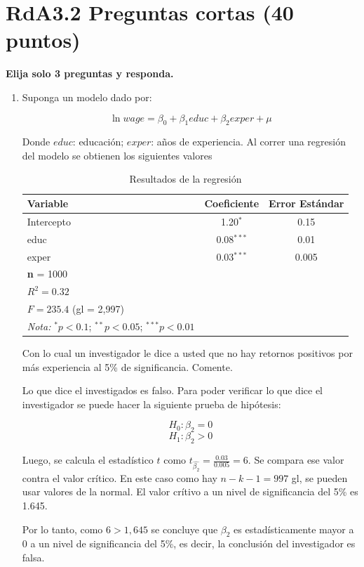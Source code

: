 \documentclass[10pt,a4paper]{article}
\begin{document}
\section{RdA3.2  Preguntas cortas (40 puntos)}
{\bf Elija solo 3 preguntas y responda. }
\begin{enumerate}
   \item    Suponga un modelo dado por:
    
    $$\ln{wage} = \beta_0 + \beta_1 educ + \beta_2 exper + \mu$$
    
    Donde $educ$: educación; $exper$: años de experiencia. Al correr una regresión del modelo se obtienen los siguientes valores
    \begin{table}[H] 
    \centering
    \caption{Resultados de la regresión}
    \begin{tabular}{lcc}
    \hline
    \hline
    \textbf{Variable} & \textbf{Coeficiente} & \textbf{Error Estándar} \\
    \hline
    Intercepto & 1.20$^{*}$ & 0.15 \\
    educ & 0.08$^{***}$ & 0.01 \\
    exper & 0.03$^{***}$ & 0.005 \\
    \hline
    \multicolumn{3}{l}{\textbf{n} = 1000} \\
    \multicolumn{3}{l}{$R^2 = 0.32$} \\
    \multicolumn{3}{l}{$F = 235.4$ (gl = 2,997)} \\
    \hline
    \hline
    \textit{Nota:} $^{*}p<0.1$; $^{**}p<0.05$; $^{***}p<0.01$
    \end{tabular}
    \end{table}
    
    {Con lo cual un investigador le dice a usted que no hay retornos positivos por más experiencia al 5\% de significancia. Comente.}\\
    
    {\color{blue} Lo que dice el investigados es falso. Para poder verificar lo que dice el investigador se puede hacer la siguiente prueba de hipótesis:
    
    $$H_0: \beta_2 = 0$$
    $$H_1: \beta_2 > 0$$
    
    Luego, se calcula el estadístico $t$ como $t_{\hat{\beta_2}} = \frac{0.03}{0.005} = 6$. Se compara ese valor contra el valor crítico. En este caso como hay $n-k-1 = 997$ gl, se pueden usar valores de la normal. El valor crítivo a un nivel de significancia del 5\% es 1.645.
    
    Por lo tanto, como $6>1,645$ se concluye que $\beta_2$ es estadísticamente mayor a 0 a un nivel de significancia del 5\%, es decir, la conclusión del investigador es falsa.}\\



\end{enumerate}
\end{document}
